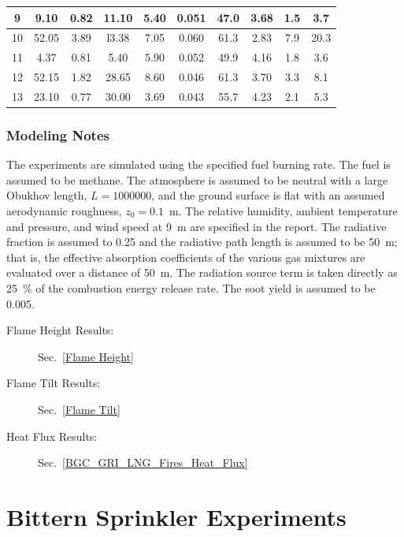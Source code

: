 \begin{table}[!ht]
\begin{tabular}{|c|c|c|c|c|c|c|c|c|c|}
9     & 9.10       & 0.82      & 11.10   & 5.40        & 0.051             & 47.0        & 3.68        & 1.5         & 3.7         \\ \hline
10    & 52.05      & 3.89      & l3.38   & 7.05        & 0.060             & 61.3        & 2.83        & 7.9         & 20.3        \\ \hline
11    & 4.37       & 0.81      & 5.40    & 5.90        & 0.052             & 49.9        & 4.16        & 1.8         & 3.6         \\ \hline
12    & 52.15      & 1.82      & 28.65   & 8.60        & 0.046             & 61.3        & 3.70        & 3.3         & 8.1         \\ \hline
13    & 23.10      & 0.77      & 30.00   & 3.69        & 0.043             & 55.7        & 4.23        & 2.1         & 5.3         \\ \hline
\end{tabular}
\end{table}

\subsubsection{Modeling Notes}

The experiments are simulated using the specified fuel burning rate. The fuel is assumed to be methane. The atmosphere is assumed to be neutral with a large Obukhov length, $L=1000000$, and the ground surface is flat with an assumed aerodynamic roughness, $z_0=0.1$~m. The relative humidity, ambient temperature and pressure, and wind speed at 9~m are specified in the report. The radiative fraction is assumed to 0.25 and the radiative path length is assumed to be 50~m; that is, the effective absorption coefficients of the various gas mixtures are evaluated over a distance of 50~m. The radiation source term is taken directly as 25~\% of the combustion energy release rate. The soot yield is assumed to be 0.005.

\begin{description}
\item[Flame Height Results:] Sec.~\ref{Flame Height}
\item[Flame Tilt Results:] Sec.~\ref{Flame Tilt}
\item[Heat Flux Results:] Sec.~\ref{BGC_GRI_LNG_Fires_Heat_Flux}
\end{description}

\FloatBarrier


\section{Bittern Sprinkler Experiments}
\label{Bittern_Sprinkler_Description}

